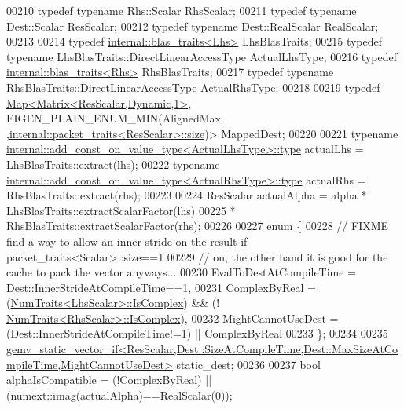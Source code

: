 \begin{DoxyCode}
00210     \textcolor{keyword}{typedef} \textcolor{keyword}{typename} Rhs::Scalar      RhsScalar;
00211     \textcolor{keyword}{typedef} \textcolor{keyword}{typename} Dest::Scalar     ResScalar;
00212     \textcolor{keyword}{typedef} \textcolor{keyword}{typename} Dest::RealScalar RealScalar;
00213     
00214     \textcolor{keyword}{typedef} \hyperlink{struct_eigen_1_1internal_1_1blas__traits}{internal::blas\_traits<Lhs>} LhsBlasTraits;
00215     \textcolor{keyword}{typedef} \textcolor{keyword}{typename} LhsBlasTraits::DirectLinearAccessType ActualLhsType;
00216     \textcolor{keyword}{typedef} \hyperlink{struct_eigen_1_1internal_1_1blas__traits}{internal::blas\_traits<Rhs>} RhsBlasTraits;
00217     \textcolor{keyword}{typedef} \textcolor{keyword}{typename} RhsBlasTraits::DirectLinearAccessType ActualRhsType;
00218     
00219     \textcolor{keyword}{typedef} \hyperlink{group___core___module_class_eigen_1_1_map}{Map<Matrix<ResScalar,Dynamic,1>}, EIGEN\_PLAIN\_ENUM\_MIN(AlignedMax
      ,\hyperlink{struct_eigen_1_1internal_1_1packet__traits}{internal::packet\_traits<ResScalar>::size})> MappedDest;
00220 
00221     \textcolor{keyword}{typename} \hyperlink{group___sparse_core___module}{internal::add\_const\_on\_value\_type<ActualLhsType>::type}
       actualLhs = LhsBlasTraits::extract(lhs);
00222     \textcolor{keyword}{typename} \hyperlink{group___sparse_core___module}{internal::add\_const\_on\_value\_type<ActualRhsType>::type}
       actualRhs = RhsBlasTraits::extract(rhs);
00223 
00224     ResScalar actualAlpha = alpha * LhsBlasTraits::extractScalarFactor(lhs)
00225                                   * RhsBlasTraits::extractScalarFactor(rhs);
00226 
00227     \textcolor{keyword}{enum} \{
00228       \textcolor{comment}{// FIXME find a way to allow an inner stride on the result if packet\_traits<Scalar>::size==1}
00229       \textcolor{comment}{// on, the other hand it is good for the cache to pack the vector anyways...}
00230       EvalToDestAtCompileTime = Dest::InnerStrideAtCompileTime==1,
00231       ComplexByReal = (\hyperlink{group___core___module_struct_eigen_1_1_num_traits}{NumTraits<LhsScalar>::IsComplex}) && (!
      \hyperlink{group___core___module_struct_eigen_1_1_num_traits}{NumTraits<RhsScalar>::IsComplex}),
00232       MightCannotUseDest = (Dest::InnerStrideAtCompileTime!=1) || ComplexByReal
00233     \};
00234 
00235     
      \hyperlink{struct_eigen_1_1internal_1_1gemv__static__vector__if}{gemv\_static\_vector\_if<ResScalar,Dest::SizeAtCompileTime,Dest::MaxSizeAtCompileTime,MightCannotUseDest>}
       static\_dest;
00236 
00237     \textcolor{keywordtype}{bool} alphaIsCompatible = (!ComplexByReal) || (numext::imag(actualAlpha)==RealScalar(0));

\end{DoxyCode}
